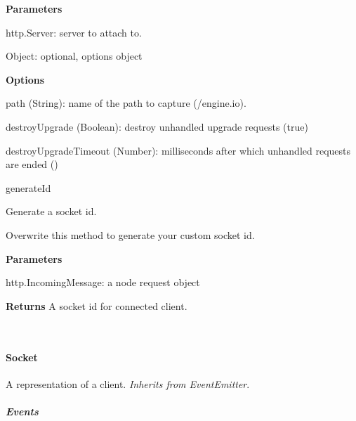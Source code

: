 \begin{DoxyItemize}
\begin{DoxyItemize}
\item {\bfseries Parameters}
\begin{DoxyItemize}
\item {\ttfamily http.\+Server}\+: server to attach to.
\item {\ttfamily Object}\+: optional, options object
\end{DoxyItemize}
\item {\bfseries Options}
\begin{DoxyItemize}
\item {\ttfamily path} ({\ttfamily String})\+: name of the path to capture ({\ttfamily /engine.io}).
\item {\ttfamily destroy\+Upgrade} ({\ttfamily Boolean})\+: destroy unhandled upgrade requests ({\ttfamily true})
\item {\ttfamily destroy\+Upgrade\+Timeout} ({\ttfamily Number})\+: milliseconds after which unhandled requests are ended ({})
\end{DoxyItemize}
\end{DoxyItemize}
\item {\ttfamily generate\+Id}
\begin{DoxyItemize}
\item Generate a socket id.
\item Overwrite this method to generate your custom socket id.
\item {\bfseries Parameters}
\begin{DoxyItemize}
\item {\ttfamily http.\+Incoming\+Message}\+: a node request object
\end{DoxyItemize}
\end{DoxyItemize}
\end{DoxyItemize}

{\bfseries Returns} A socket id for connected client.



~\newline


\paragraph*{Socket}

A representation of a client. {\itshape Inherits from Event\+Emitter}.

\subparagraph*{Events}


